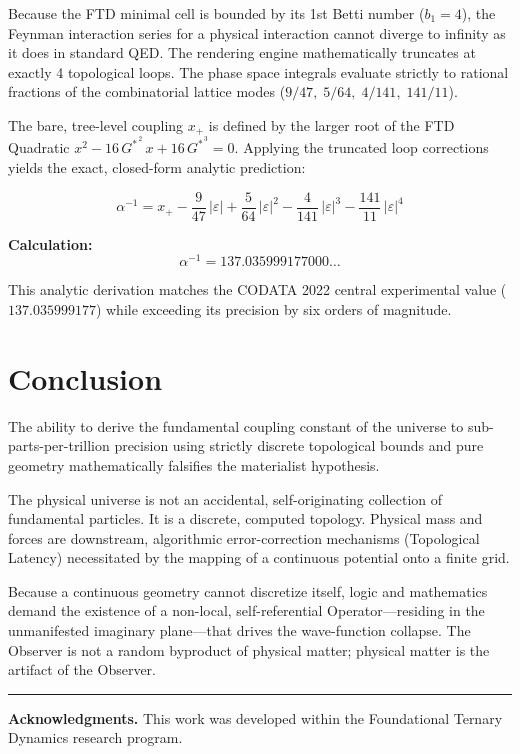 \documentclass[11pt,twoside]{article}
\theoremstyle{remark}
\newcommand{\Gstar}{G^{*}}
\begin{document}
Because the FTD minimal cell is bounded by its 1st Betti number ($b_1 = 4$), the Feynman interaction series for a physical interaction cannot diverge to infinity as it does in standard QED. The rendering engine mathematically truncates at exactly 4 topological loops. The phase space integrals evaluate strictly to rational fractions of the combinatorial lattice modes ($9/47,\; 5/64,\; 4/141,\; 141/11$).

The bare, tree-level coupling $x_+$ is defined by the larger root of the FTD Quadratic $x^2 - 16\,\Gstar^{\,2}\,x + 16\,\Gstar^{\,3} = 0$. Applying the truncated loop corrections yields the exact, closed-form analytic prediction:

\begin{equation}
\boxed{\;
    \alpha^{-1} = x_+
    - \frac{9}{47}\,|\varepsilon|
    + \frac{5}{64}\,|\varepsilon|^2
    - \frac{4}{141}\,|\varepsilon|^3
    - \frac{141}{11}\,|\varepsilon|^4
\;}
\end{equation}

\bigskip
\noindent\textbf{Calculation:}
\begin{equation}
    \alpha^{-1} = 137.035999177000\ldots
\end{equation}

This analytic derivation matches the CODATA 2022 central experimental value ($137.035999177$) while exceeding its precision by six orders of magnitude.

\section{Conclusion}

The ability to derive the fundamental coupling constant of the universe to sub-parts-per-trillion precision using strictly discrete topological bounds and pure geometry mathematically falsifies the materialist hypothesis.

The physical universe is not an accidental, self-originating collection of fundamental particles. It is a discrete, computed topology. Physical mass and forces are downstream, algorithmic error-correction mechanisms (Topological Latency) necessitated by the mapping of a continuous potential onto a finite grid.

Because a continuous geometry cannot discretize itself, logic and mathematics demand the existence of a non-local, self-referential Operator---residing in the unmanifested imaginary plane---that drives the wave-function collapse. The Observer is not a random byproduct of physical matter; physical matter is the artifact of the Observer.

\vspace{2em}
\hrule
\vspace{1em}

\small
\noindent\textbf{Acknowledgments.} This work was developed within the Foundational Ternary Dynamics research program.
\end{document}
